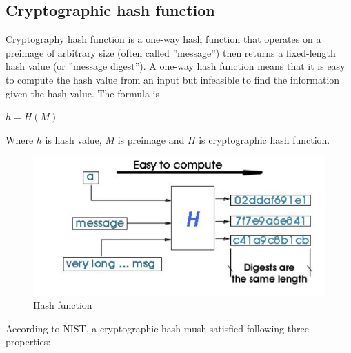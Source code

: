 \subsection{Cryptographic hash function}

Cryptography hash function is a one-way hash function that operates on a preimage of arbitrary size (often called ”message”) then returns a fixed-length hash value (or ”message digest”). A one-way hash function means that it is easy to compute the hash value from an input but infeasible to find the information given the hash value. The formula is\\

\vspace{0.2cm}
\begin{center}
  $h = H(M)$\\
\end{center}
\vspace{0.2cm}

Where $h$ is hash value, $M$ is preimage and $H$ is cryptographic hash function.\\
\vspace{0.2cm}
\begin{figure}[ht!]
  \centering
  \includegraphics[width=1\textwidth]{images/hash_function.png}
  \caption[Hash function]{Hash function}
  \label{fig:hash_function}
\end{figure}

According to NIST, a cryptographic hash mush satisfied following three properties:

